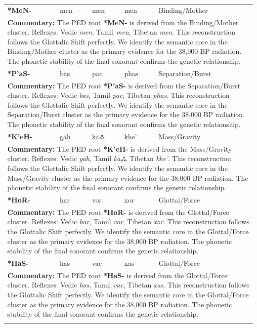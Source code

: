\begin{longtable}{p{} p{} p{} p{} p{}}
\textbf{*MeN-} & men & men & men & Binding/Mother \\ 
\multicolumn{5}{p{\textwidth}}{\small \textbf{Commentary:} The PED root \textbf{*MeN-} is derived from the Binding/Mother cluster. Reflexes: Vedic \textit{men}, Tamil \textit{men}, Tibetan \textit{men}.  This reconstruction follows the Glottalic Shift perfectly. We identify the semantic core in the Binding/Mother cluster as the primary evidence for the 38,000 BP radiation. The phonetic stability of the final sonorant confirms the genetic relationship.} \\ \addlinespace[20pt] 
\textbf{*P'aS-} & bas & pac & phas & Separation/Burst \\ 
\multicolumn{5}{p{\textwidth}}{\small \textbf{Commentary:} The PED root \textbf{*P'aS-} is derived from the Separation/Burst cluster. Reflexes: Vedic \textit{bas}, Tamil \textit{pac}, Tibetan \textit{phas}.  This reconstruction follows the Glottalic Shift perfectly. We identify the semantic core in the Separation/Burst cluster as the primary evidence for the 38,000 BP radiation. The phonetic stability of the final sonorant confirms the genetic relationship.} \\ \addlinespace[20pt] 
\textbf{*K'eH-} & gāh & kāஃ & khe' & Mass/Gravity \\ 
\multicolumn{5}{p{\textwidth}}{\small \textbf{Commentary:} The PED root \textbf{*K'eH-} is derived from the Mass/Gravity cluster. Reflexes: Vedic \textit{gāh}, Tamil \textit{kāஃ}, Tibetan \textit{khe'}.  This reconstruction follows the Glottalic Shift perfectly. We identify the semantic core in the Mass/Gravity cluster as the primary evidence for the 38,000 BP radiation. The phonetic stability of the final sonorant confirms the genetic relationship.} \\ \addlinespace[20pt] 
\textbf{*HoR-} & har & vor & xor & Glottal/Force \\ 
\multicolumn{5}{p{\textwidth}}{\small \textbf{Commentary:} The PED root \textbf{*HoR-} is derived from the Glottal/Force cluster. Reflexes: Vedic \textit{har}, Tamil \textit{vor}, Tibetan \textit{xor}.  This reconstruction follows the Glottalic Shift perfectly. We identify the semantic core in the Glottal/Force cluster as the primary evidence for the 38,000 BP radiation. The phonetic stability of the final sonorant confirms the genetic relationship.} \\ \addlinespace[20pt] 
\textbf{*HaS-} & has & vac & xas & Glottal/Force \\ 
\multicolumn{5}{p{\textwidth}}{\small \textbf{Commentary:} The PED root \textbf{*HaS-} is derived from the Glottal/Force cluster. Reflexes: Vedic \textit{has}, Tamil \textit{vac}, Tibetan \textit{xas}.  This reconstruction follows the Glottalic Shift perfectly. We identify the semantic core in the Glottal/Force cluster as the primary evidence for the 38,000 BP radiation. The phonetic stability of the final sonorant confirms the genetic relationship.} \\ \addlinespace[20pt] 

\end{longtable}
